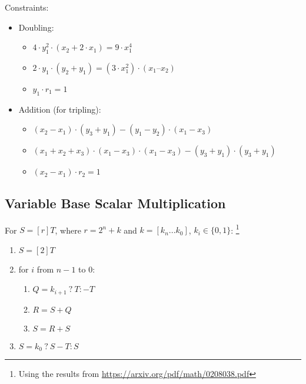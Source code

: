 Constraints:
\begin{itemize}
	\item Doubling:
	\begin{itemize}
		\item $4 \cdot y_1^2 \cdot (x_2 + 2 \cdot x_1) = 9 \cdot x_1^4$
		\item $2 \cdot y_1 \cdot (y_2 + y_1) = (3 \cdot x_1^2) \cdot (x_1 – x_2)$
		\item $y_1 \cdot r_1 = 1$
	\end{itemize}
	\item Addition (for tripling):
	\begin{itemize}
		\item $(x_2 - x_1) \cdot (y_3 + y_1) - (y_1 - y_2) \cdot (x_1 - x_3)$
		\item $(x_1 + x_2 + x_3) \cdot (x_1 - x_3) \cdot (x_1 - x_3) - (y_3 + y_1) \cdot (y_3 + y_1)$
		\item $(x_2 - x_1) \cdot r_2 = 1$
	\end{itemize}
\end{itemize}


\subsection{Variable Base Scalar Multiplication}
For $S  = [r]T$, where $r = 2^n + k$ and $k = [k_n ... k_0]$, $k_i \in \{0, 1\}$:
\footnote{Using the results from \url{https://arxiv.org/pdf/math/0208038.pdf}}
\begin{enumerate}
	\item $S = [2]T$
	\item for $i$ from $n - 1$ to $0$:
	\begin{enumerate}
		\item $Q = k_{i + 1} \: ? \: T : -T$\
		\item $R = S + Q$
		\item $S = R + S$
	\end{enumerate}
	\item $S = k_0 \: ? \: S - T : S$
\end{enumerate}


